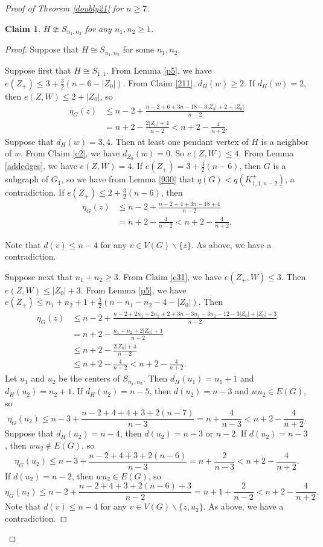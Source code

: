\documentclass[12pt]{article}
\newtheorem {claim}{Claim}[section]
\begin{document}
\begin{proof}[Proof of Theorem \ref{doubly21} for $n\ge 7$]
\begin{claim}\label{sn1n2}
$H\ncong S_{n_1,n_2}$ for any $n_1, n_2\ge 1$.
\end{claim}
\begin{proof} Suppose that $H\cong S_{n_1,n_2}$ for some $n_1, n_2$.

Suppose first that $H\cong S_{1,1}$. From Lemma \ref{p5}, we have $e(Z_+)\le 3+\frac{3}{2}\left(n-6-|Z_0|\right)$.
From Claim \ref{211}, $d_{H}(w)\ge 2$.
If  $d_{H}(w)= 2$, then $e(Z,W)\le 2+|Z_0|$, so
\begin{align*}
\eta_G(z)&\le n-2+\frac{n-2+6+3n-18-3|Z_0|+2+|Z_0|}{n-2}\\
&=n+2-\frac{2|Z_0|+4}{n-2}<n+2-\frac{4}{n+2}.
\end{align*}
Suppose that $d_{H}(w)=3,4$. Then at least one pendant vertex of $H$ is a neighbor of $w$.
From Claim \ref{c2}, we have $d_{Z_0}(w)=0$.
So $e(Z,W)\le 4$. From Lemma \ref{addedges},  we have $e(Z,W)=4$.
If $e(Z_+)=3+\frac{3}{2}\left(n-6\right)$, then $G$ is a subgraph of $G_1$,
so we have from Lemma \ref{930} that $q(G)<q(K_{1,1,n-2}^+)$, a contradiction.
If $e(Z_+)\le 2+\frac{3}{2}\left(n-6\right)$, then
\begin{align*}
\eta_G(z)&\le n-2+\frac{n-2+4+3n-18+4}{n-2}\\
&=n+2-\frac{4}{n-2}<n+2-\frac{4}{n+2}.
\end{align*}

Note that $d(v)\le n-4$ for any $v\in V(G)\backslash\{z\}$.
As above, we have a contradiction.

Suppose next that $n_1+n_2\ge 3$. From Claim \ref{c31}, we have $e(Z_+,W)\le 3$.
Then $e(Z,W)\le |Z_0|+3$.
From Lemma \ref{p5}, we have $e(Z_+)\le n_1+n_2+1+\frac{3}{2}\left(n-n_1-n_2-4-|Z_0|\right)$.
Then
\begin{align*}
\eta_G(z)&\le n-2+\frac{n-2+2n_1+2n_2+2+3n-3n_1-3n_2-12-3|Z_0|+|Z_0|+3}{n-2}\\
&=n+2-\frac{n_1+n_2+2|Z_0|+1}{n-2}\\
&\le n+2-\frac{2|Z_0|+4}{n-2}\\
&\le n+2-\frac{4}{n-2}<n+2-\frac{4}{n+2}.
\end{align*}
Let $u_1$ and $u_2$ be the centers of $S_{n_1,n_2}$.
Then $d_H(u_1)=n_1+1$ and $d_H(u_2)=n_2+1$.
If $d_H(u_2)=n-5$, then $d(u_2)=n-3$ and $wu_2\in E(G)$, so
\[
\eta_G(u_2)\le n-3+\frac{n-2+4+4+3+2(n-7)}{n-3}=n+\frac{4}{n-3}<n+2-\frac{4}{n+2}.
\]
Suppose that $d_H(u_2)=n-4$, then $d(u_2)=n-3$ or $n-2$.
If $d(u_2)=n-3$, then  $wu_2\notin E(G)$, so
\[
\eta_G(u_2)\le n-3+\frac{n-2+4+3+2(n-6)}{n-3}=n+\frac{2}{n-3}<n+2-\frac{4}{n+2}.
\]
If $d(u_2)=n-2$, then $wu_2\in E(G)$, so
\[
\eta_G(u_2)\le n-2+\frac{n-2+4+3+2(n-6)+3}{n-2}=n+1+\frac{2}{n-2}<n+2-\frac{4}{n+2}.
\]
Note that $d(v)\le n-4$ for any $v\in V(G)\backslash\{z,u_2\}$.
As above, we have a contradiction.
\end{proof}


\end{proof}
\end{document}
